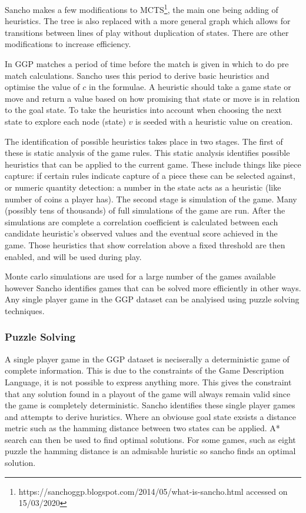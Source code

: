 Sancho makes a few modifications to MCTS\footnote{https://sanchoggp.blogspot.com/2014/05/what-is-sancho.html accessed on 15/03/2020}, the main one being adding of heuristics. The tree is also replaced with a more general graph which allows for transitions between lines of play without duplication of states. There are other modifications to increase efficiency.

In GGP matches a period of time before the match is given in which to do pre match calculations. Sancho uses this period to derive basic heuristics and optimise the value of $c$ in the formulae. A heuristic should take a game state or move and return a value based on how promising that state or move is in relation to the goal state. To take the heuristics into account when choosing the next state to explore each node (state) $v$ is seeded with a heuristic value on creation.

The identification of possible heuristics takes place in two stages. The first of these is static analysis of the game rules. This static analysis identifies possible heuristics that can be applied to the current game. These include things like piece capture: if certain rules indicate capture of a piece these can be selected against, or numeric quantity detection: a number in the state acts as a heuristic (like number of coins a player has). The second stage is simulation of the game. Many (possibly tens of thousands) of full simulations of the game are run. After the simulations are complete a correlation coefficient is calculated between each candidate heuristic's observed values and the eventual score achieved in the game. Those heuristics that show correlation above a fixed threshold are then enabled, and will be used during play.

Monte carlo simulations are used for a large number of the games available however Sancho identifies games that can be solved more efficiently in other ways. Any single player game in the GGP dataset can be analyised using puzzle solving techniques.
\subsubsection{Puzzle Solving}
A single player game in the GGP dataset is neciserally a deterministic game of complete information. This is due to the constraints of the Game Description Language, it is not possible to express anything more. This gives the constraint that any solution found in a playout of the game will always remain valid since the game is completely deterministic. Sancho identifies these single player games and attempts to derive huristics. Where an obviouse goal state exsists a distance metric such as the hamming distance between two states can be applied. A* search can then be used to find optimal solutions. For some games, such as eight puzzle the hamming distance is an admisable huristic so sancho finds an optimal solution.

